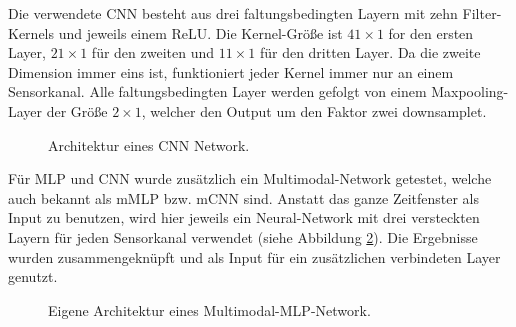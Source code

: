 Die verwendete CNN besteht aus drei faltungsbedingten Layern mit zehn Filter-Kernels und jeweils einem ReLU.
Die Kernel-Größe ist $41 \times 1$ for den ersten Layer, $21 \times 1$ für den zweiten und $11 \times 1$ für den dritten Layer.
Da die zweite Dimension immer eins ist, funktioniert jeder Kernel immer nur an einem Sensorkanal.
Alle faltungsbedingten Layer werden gefolgt von einem Maxpooling-Layer der Größe $2 \times 1$, welcher den Output um den Faktor zwei downsamplet. \\


\begin{figure}[H]
\caption{Architektur eines CNN Network. }
\label{fig:cnn} \end{figure} \vspace{0.5cm}



Für MLP und CNN wurde zusätzlich ein Multimodal-Network getestet, welche auch bekannt als mMLP bzw. mCNN sind.
Anstatt das ganze Zeitfenster als Input zu benutzen, wird hier jeweils ein Neural-Network mit drei versteckten Layern für jeden Sensorkanal verwendet (siehe Abbildung \ref{fig:multimodal_dnn}).
Die Ergebnisse wurden zusammengeknüpft und als Input für ein zusätzlichen verbindeten Layer genutzt. \\


\begin{figure}[H]
\caption{Eigene Architektur eines Multimodal-MLP-Network. }
\label{fig:multimodal_dnn} \end{figure} \vspace{0.5cm}


